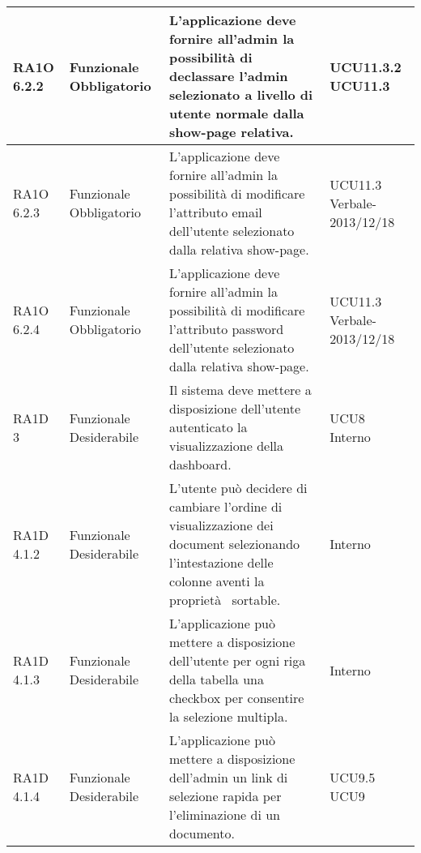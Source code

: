 \begin{center}
\begin{longtable}{ | l | p{2cm} | p{5cm} | p{1.7cm} |}
        RA1O 6.2.2 & Funzionale \newline  Obbligatorio  & L'applicazione deve fornire all'admin la possibilità di declassare l'admin selezionato a livello di utente normale dalla show-page relativa. &  UCU11.3.2 \newline  UCU11.3 \newline  \\ \hline      
        RA1O 6.2.3 & Funzionale \newline  Obbligatorio  & L'applicazione deve fornire all'admin la possibilità di modificare l'attributo email dell'utente selezionato dalla relativa show-page. &  UCU11.3 \newline  Verbale-2013/12/18 \newline  \\ \hline      
        RA1O 6.2.4 & Funzionale \newline  Obbligatorio  & L'applicazione deve fornire all'admin la possibilità di modificare l'attributo password dell'utente selezionato dalla relativa show-page. &  UCU11.3 \newline  Verbale-2013/12/18 \newline  \\ \hline      
        RA1D 3  & Funzionale \newline  Desiderabile  & Il sistema deve mettere a disposizione dell'utente autenticato la visualizzazione della dashboard. &  UCU8 \newline  Interno \newline  \\ \hline      
        RA1D 4.1.2  & Funzionale \newline  Desiderabile  & L'utente può decidere di cambiare l'ordine di visualizzazione dei document selezionando l'intestazione delle colonne aventi la proprietà  sortable.
 &  Interno \newline  \\ \hline      
        RA1D 4.1.3  & Funzionale \newline  Desiderabile  & L'applicazione può mettere a disposizione dell'utente per ogni riga della tabella una checkbox per consentire la selezione multipla.
 &  Interno \newline  \\ \hline      
        RA1D 4.1.4  & Funzionale \newline  Desiderabile  & L'applicazione può mettere a disposizione dell'admin un link di selezione rapida per l'eliminazione di un documento.
 &  UCU9.5 \newline  UCU9 \newline  \\ \hline      

\end{longtable}
\end{center}
